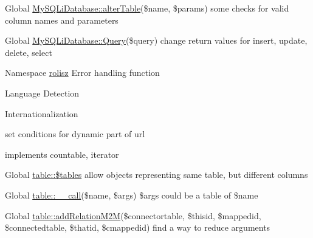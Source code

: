 \label{todo__todo000004}
\hypertarget{todo__todo000004}{}
 
\begin{DoxyDescription}
\item[Global \hyperlink{class_my_s_q_li_database_aa8cf3e2be109e548bed6980622fffb41}{MySQLiDatabase::alterTable}(\$name, \$params) ]some checks for valid column names and parameters 
\end{DoxyDescription}

\label{todo__todo000003}
\hypertarget{todo__todo000003}{}
 
\begin{DoxyDescription}
\item[Global \hyperlink{class_my_s_q_li_database_aebc962126fd37fd3478c4689156d5f83}{MySQLiDatabase::Query}(\$query) ]change return values for insert, update, delete, select 
\end{DoxyDescription}

\label{todo__todo000001}
\hypertarget{todo__todo000001}{}
 
\begin{DoxyDescription}
\item[Namespace \hyperlink{namespacerolisz}{rolisz} ]Error handling function 

Language Detection 

Internationalization 

set conditions for dynamic part of url 

implements countable, iterator 
\end{DoxyDescription}

\label{todo__todo000005}
\hypertarget{todo__todo000005}{}
 
\begin{DoxyDescription}
\item[Global \hyperlink{classtable_a3d332a3c374a53802495dcb045f6133f}{table::\$tables} ]allow objects representing same table, but different columns 
\end{DoxyDescription}

\label{todo__todo000006}
\hypertarget{todo__todo000006}{}
 
\begin{DoxyDescription}
\item[Global \hyperlink{classtable_af231e86ad32039b9573ae228db5a29fa}{table::\_\-\_\-call}(\$name, \$args) ]\$args could be a table of \$name 
\end{DoxyDescription}

\label{todo__todo000007}
\hypertarget{todo__todo000007}{}
 
\begin{DoxyDescription}
\item[Global \hyperlink{classtable_a29c2012e7cc6b182cc3ca63acfc324b9}{table::addRelationM2M}(\$connectortable, \$thisid, \$mappedid, \$connectedtable, \$thatid, \$cmappedid) ]find a way to reduce arguments 
\end{DoxyDescription}